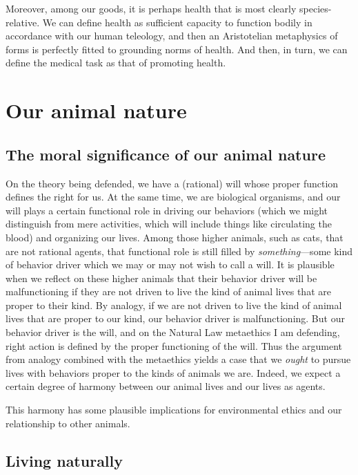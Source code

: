 Moreover, among our goods, it is perhaps health that is most clearly species-relative. 
We can define health as sufficient capacity to function bodily in accordance with our human teleology, and then
an Aristotelian metaphysics of forms is perfectly fitted to grounding norms of health. And then, in turn, we can
define the medical task as that of promoting health.

\section{Our animal nature}
\subsection{The moral significance of our animal nature}
On the theory being defended, we have a (rational) will whose proper function defines the right for us. At the same time, 
we are biological organisms, and our will plays a certain functional role in driving our behaviors (which we might
distinguish from mere activities, which will include things like circulating the blood)
and organizing our 
lives. Among those higher animals, such as cats, that are not rational agents, that functional role is still filled by 
\textit{something}---some kind of behavior driver which we may or may not wish to call a will. It is plausible when 
we reflect on these higher animals that their behavior driver will be malfunctioning if they are not driven to live the kind
of animal lives that are proper to their kind. By analogy, if we are not driven to live the kind of animal lives
that are proper to our kind, our behavior driver is malfunctioning. But our behavior driver is the will, and on the Natural Law
metaethics I am defending, right action is defined by the proper functioning of the will. Thus the argument from analogy combined
with the metaethics yields a case that we \textit{ought} to pursue lives with behaviors proper to the kinds of animals we are. Indeed, we expect
a certain degree of harmony between our animal lives and our lives as agents.

This harmony has some plausible implications for environmental ethics and our relationship to other animals. 

\subsection{Living naturally}
